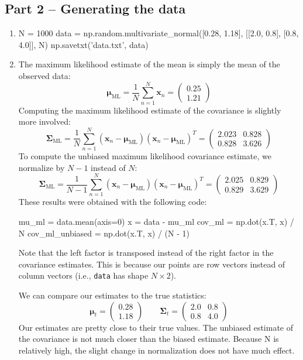 \documentclass{article}
\begin{document}
\subsection*{Part 2 -- Generating the data}
\begin{enumerate}
\item 
\begin{python}
N = 1000
data = np.random.multivariate_normal([0.28, 1.18], 
				     [[2.0, 0.8], 
				      [0.8, 4.0]], 
				     N)
np.savetxt('data.txt', data)
\end{python}
\item The maximum likelihood estimate of the mean is simply the mean of the observed data:
$$
\bm{\mu}_\text{ML} = \frac{1}{N}\sum_{n=1}^N\bm{x}_n = \begin{pmatrix}0.25 \\ 1.21 \end{pmatrix}
$$
Computing the maximum likelihood estimate of the covariance is slightly more involved:
$$
\bm{\Sigma}_\text{ML} = \frac{1}{N}\sum_{n=1}^N(\bm{x}_n - \bm{\mu}_\text{ML})(\bm{x}_n - \bm{\mu}_\text{ML})^T = 
\begin{pmatrix}
2.023 & 0.828 \\
0.828 & 3.626
\end{pmatrix}
$$
To compute the unbiased maximum likelihood covariance estimate, we normalize by $N - 1$ instead of $N$:
$$
\bm{\Sigma}_\text{ML} = \frac{1}{N - 1}\sum_{n=1}^N(\bm{x}_n - \bm{\mu}_\text{ML})(\bm{x}_n - \bm{\mu}_\text{ML})^T = 
\begin{pmatrix}
2.025 & 0.829 \\
0.829 & 3.629
\end{pmatrix}
$$
These results were obtained with the following code:
\begin{python}
mu_ml = data.mean(axis=0)
x = data - mu_ml
cov_ml = np.dot(x.T, x) / N
cov_ml_unbiased = np.dot(x.T, x) / (N - 1)
\end{python}
Note that the left factor is transposed instead of the right factor in the covariance estimates. This is because our points are row vectors instead of column vectors (i.e., \texttt{data} has shape $N \times 2$).

\par We can compare our estimates to the true statistics:
$$
\bm{\mu}_t = \begin{pmatrix} 0.28 \\ 1.18\end{pmatrix} \hspace{2em} \bm{\Sigma}_t = \begin{pmatrix} 2.0 & 0.8 \\ 0.8 & 4.0 \end{pmatrix}
$$
Our estimates are pretty close to their true values. The unbiased estimate of the covariance is not much closer than the biased estimate. Because N is relatively high, the slight change in normalization does not have much effect.
\end{enumerate}
\pagebreak
\end{document}
